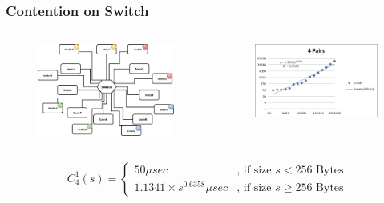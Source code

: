 \documentclass{beamer}
\begin{document}
\begin{frame}
\frametitle{Contention on Switch}
\begin{columns}[c]

\begin{figure}
\includegraphics[width=\linewidth,height=\textheight,keepaspectratio]{congestion4.jpg}
\end{figure}

\begin{figure}
\includegraphics[width=\linewidth,height=\textheight,keepaspectratio]{picture7.jpg}
\end{figure}

\end{columns}

\begin{block}{}
\begin{equation*}
C_4 ^1(s)=\begin{cases}
50 \mu sec & \text{, if size }s < 256 \text{ Bytes} \\
1.1341\times s^{0.6358} \mu sec & \text{, if size } s \geq 256 \text{ Bytes}
\end{cases}
\end{equation*}
\end{block}

\end{frame}
\end{document}
